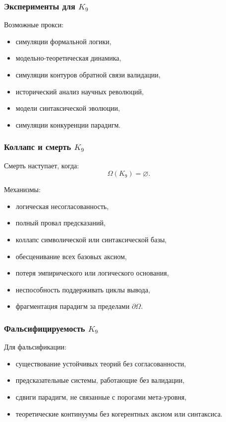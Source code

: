 \subsubsection{Эксперименты для \texorpdfstring{$K_9$}{K_9}}

Возможные прокси:
\begin{itemize}
    \item симуляции формальной логики,
    \item модельно-теоретическая динамика,
    \item симуляции контуров обратной связи валидации,
    \item исторический анализ научных революций,
    \item модели синтаксической эволюции,
    \item симуляции конкуренции парадигм.
\end{itemize}

\subsubsection{Коллапс и смерть \texorpdfstring{$K_9$}{K_9}}

Смерть наступает, когда:
\[
\Omega(K_9)=\varnothing.
\]

Механизмы:
\begin{itemize}
    \item логическая несогласованность,
    \item полный провал предсказаний,
    \item коллапс символической или синтаксической базы,
    \item обесценивание всех базовых аксиом,
    \item потеря эмпирического или логического основания,
    \item неспособность поддерживать циклы вывода,
    \item фрагментация парадигм за пределами $\partial\Omega$.
\end{itemize}

\subsubsection{Фальсифицируемость \texorpdfstring{$K_9$}{K_9}}

Для фальсификации:
\begin{itemize}
    \item существование устойчивых теорий без согласованности,
    \item предсказательные системы, работающие без валидации,
    \item сдвиги парадигм, не связанные с порогами мета-уровня,
    \item теоретические континуумы без когерентных аксиом или синтаксиса.
\end{itemize}

